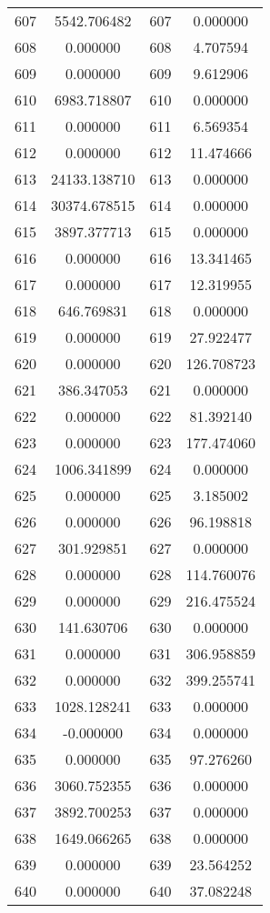 \documentclass[12pt]{article}
\begin{document}
\begin{longtable}{@{}cccc@{}}
607 & 5542.706482 & 607 & 0.000000 \\
608 & 0.000000 & 608 & 4.707594 \\
609 & 0.000000 & 609 & 9.612906 \\
610 & 6983.718807 & 610 & 0.000000 \\
611 & 0.000000 & 611 & 6.569354 \\
612 & 0.000000 & 612 & 11.474666 \\
613 & 24133.138710 & 613 & 0.000000 \\
614 & 30374.678515 & 614 & 0.000000 \\
615 & 3897.377713 & 615 & 0.000000 \\
616 & 0.000000 & 616 & 13.341465 \\
617 & 0.000000 & 617 & 12.319955 \\
618 & 646.769831 & 618 & 0.000000 \\
619 & 0.000000 & 619 & 27.922477 \\
620 & 0.000000 & 620 & 126.708723 \\
621 & 386.347053 & 621 & 0.000000 \\
622 & 0.000000 & 622 & 81.392140 \\
623 & 0.000000 & 623 & 177.474060 \\
624 & 1006.341899 & 624 & 0.000000 \\
625 & 0.000000 & 625 & 3.185002 \\
626 & 0.000000 & 626 & 96.198818 \\
627 & 301.929851 & 627 & 0.000000 \\
628 & 0.000000 & 628 & 114.760076 \\
629 & 0.000000 & 629 & 216.475524 \\
630 & 141.630706 & 630 & 0.000000 \\
631 & 0.000000 & 631 & 306.958859 \\
632 & 0.000000 & 632 & 399.255741 \\
633 & 1028.128241 & 633 & 0.000000 \\
634 & -0.000000 & 634 & 0.000000 \\
635 & 0.000000 & 635 & 97.276260 \\
636 & 3060.752355 & 636 & 0.000000 \\
637 & 3892.700253 & 637 & 0.000000 \\
638 & 1649.066265 & 638 & 0.000000 \\
639 & 0.000000 & 639 & 23.564252 \\
640 & 0.000000 & 640 & 37.082248 \\

\end{longtable}
\end{document}

